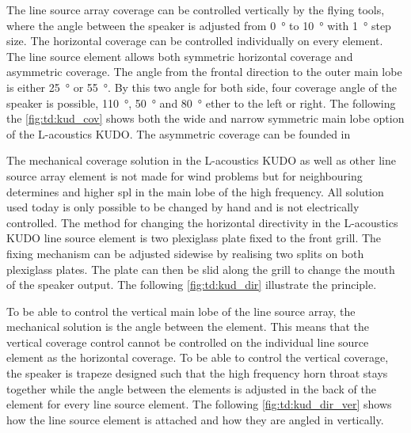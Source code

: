 The line source array coverage can be controlled vertically by the flying tools, where the angle between the speaker is adjusted from \SI{0}{\degree} to \SI{10}{\degree} with \SI{1}{\degree} step size. The horizontal coverage can be controlled individually on every element. The line source element allows both symmetric horizontal coverage and asymmetric coverage. The angle from the frontal direction to the outer main lobe  is either \SI{25}{\degree} or \SI{55}{\degree}. By this two angle for both side, four coverage angle of the speaker is possible, \SI{110}{\degree}, \SI{50}{\degree} and \SI{80}{\degree} ether to the left or right. The following the \autoref{fig:td:kud_cov} shows both the wide and narrow symmetric main lobe option of the L-acoustics KUDO. The asymmetric coverage can be founded in \citep{KUDO_data}




The mechanical coverage solution in the L-acoustics KUDO as well as other line source array element is not made for wind problems but for neighbouring determines and higher \gls{spl} in the main lobe of the high frequency. All solution used today is only possible to be changed by hand and is not electrically controlled. The method for changing the horizontal directivity in the L-acoustics KUDO line source element is two plexiglass plate fixed to the front grill. The fixing mechanism can be adjusted sidewise by realising two splits on both plexiglass plates. The plate can then be slid along the grill to change the mouth of the speaker output. The following \autoref{fig:td:kud_dir} illustrate the principle.


To be able to control the vertical main lobe of the line source array, the mechanical solution is the angle between the element. This means that the vertical coverage control cannot be controlled on the individual line source element as the horizontal coverage. To be able to control the vertical coverage, the speaker is trapeze designed such that the high frequency horn throat stays together while the angle between the elements is adjusted in the back of the element for every line source element. The following \autoref{fig:td:kud_dir_ver} shows how the line source element is attached and how they are angled in vertically.

